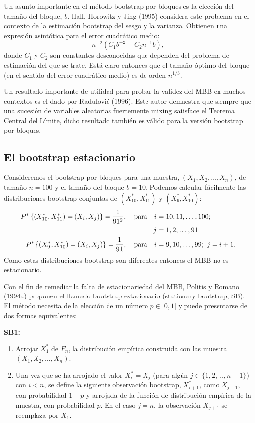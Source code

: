 \documentclass[]{book}
\theoremstyle{definition}
\theoremstyle{definition}
\theoremstyle{definition}
\theoremstyle{remark}
\begin{document}
Un asunto importante en el método bootstrap por bloques es la elección
del tamaño del bloque, \(b\). Hall, Horowitz y Jing (1995) considera
este problema en el contexto de la estimación bootstrap del sesgo y la
varianza. Obtienen una expresión asintótica para el error cuadrático
medio: \[n^{-2}(C_1b^{-2}+C_2n^{-1}b),\] donde \(C_1\) y \(C_2\) son
constantes desconocidas que dependen del problema de estimación del que
se trate. Está claro entonces que el tamaño óptimo del bloque (en el
sentido del error cuadrático medio) es de orden \(n^{1/3}\).

Un resultado importante de utilidad para probar la validez del MBB en
muchos contextos es el dado por Radulović (1996). Este autor demuestra
que siempre que una sucesión de variables aleatorias fuertemente mixing
satisface el Teorema Central del Límite, dicho resultado también es
válido para la versión bootstrap por bloques.

\subsection{El bootstrap estacionario}\label{el-bootstrap-estacionario}

Consideremos el bootstrap por bloques para una muestra,
\((X_1,X_2,\ldots ,X_n)\), de tamaño \(n=100\) y el tamaño del bloque
\(b=10\). Podemos calcular fácilmente las distribuciones bootstrap
conjuntas de \((X_{10}^{\ast},X_{11}^{\ast})\) y
\((X_{9}^{\ast},X_{10}^{\ast})\): \[\begin{aligned}
P^{\ast}\left\{ (X_{10}^{\ast},X_{11}^{\ast})=(X_i,X_j)\right\} =
\frac{1}{91^2},\quad \hbox{para}\quad i &= 10,11,\ldots ,100; \\
j &= 1,2,\ldots ,91 \\
P^{\ast}\left\{ (X_{9}^{\ast},X_{10}^{\ast})=(X_i,X_j)\right\} =\frac{
1}{91},\quad \hbox{para}\quad i &= 9,10,\ldots ,99;\,\,j=i+1.\end{aligned}\]Como
estas distribuciones bootstrap son diferentes entonces el MBB no es
estacionario.

Con el fin de remediar la falta de estacionariedad del MBB, Politis y
Romano (1994a) proponen el llamado bootstrap estacionario (stationary
bootstrap, SB). El método necesita de la elección de un número
\(p\in \lbrack 0,1]\) y puede presentarse de dos formas equivalentes:

\textbf{SB1:}

\begin{enumerate}
\def\labelenumi{\arabic{enumi}.}
\item
  Arrojar \(X_1^{\ast}\) de \(F_n\), la distribución empírica construida
  con las muestra \((X_1,X_2,\ldots ,X_n).\)
\item
  Una vez que se ha arrojado el valor \(X_i^{\ast}=X_j\) (para algún
  \(j\in \{1,2,\ldots ,n-1\}\)) con \(i<n\), se define la siguiente
  observación bootstrap, \(X_{i+1}^{\ast}\), como \(X_{j+1}\), con
  probabilidad \(1-p\) y arrojada de la función de distribución empírica
  de la muestra, con probabilidad \(p\). En el caso \(j=n\), la
  observación \(X_{j+1}\) se reemplaza por \(X_1\).
\end{enumerate}
\end{document}
